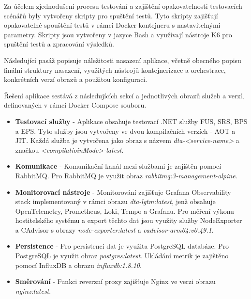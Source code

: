 Za účelem zjednodušení procesu testování a zajištění opakovatelnosti testovacích scénářů byly vytvořeny skripty pro spuštění testů. Tyto skripty zajišťují opakovatelné spouštění testů v rámci Docker kontejneru s nastavitelnými parametry. Skripty jsou vytvořeny v jazyce Bash a využívají nástroje K6 pro spuštění testů a zpracování výsledků.


Následující pasáž popisuje náležitosti nasazení aplikace, včetně obecného popisu finální struktury nasazení, využitých nástrojů kontejnerizace a orchestrace, konkrétních verzí obrazů a použitou konfiguraci.


Řešení aplikace sestává z následujících sekcí a jednotlivých obrazů služeb a verzí, definovaných v rámci Docker Compose souboru.

\begin{itemize}
    \item \textbf{Testovací služby} - Aplikace obsahuje testovací .NET služby FUS, SRS, BPS a EPS. Tyto služby jsou vytvořeny ve dvou kompilačních verzích - AOT a JIT. Každá služba je vytvořena jako obraz s názvem \emph{dta-<service-name>} a značkou \emph{<compilatioinMode>-latest}.
    \item \textbf{Komunikace} - Komunikační kanál mezi službami je zajištěn pomocí RabbitMQ. Pro RabbitMQ je využit obraz \emph{rabbitmq:3-management-alpine}.
    \item \textbf{Monitorovací nástroje} - Monitorování zajišťuje Grafana Observability stack implementovaný v rámci obrazu \emph{dta-lgtm:latest}, jenž obsahuje OpenTelemetry, Prometheus, Loki, Tempo a Grafanu. Pro měření výkonu hostitelského systému a export těchto dat jsou využity služby NodeExporter a CAdvisor s obrazy \emph{node-exporter:latest} a \emph{cadvisor-arm64:v0.49.1}.
    \item \textbf{Persistence} - Pro persistenci dat je využita PostgreSQL databáze. Pro PostgreSQL je využit obraz \emph{postgres:latest}. Ukládání metrik je zajištěno pomocí InfluxDB a obrazu \emph{influxdb:1.8.10}.
    \item \textbf{Směrování} - Funkci reverzní proxy zajišťuje Nginx ve verzi obrazu \emph{nginx:latest}.
\end{itemize}




